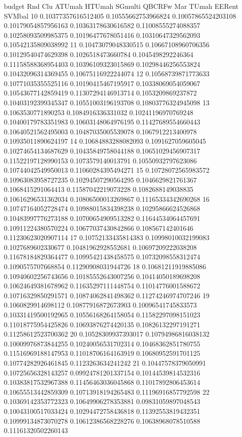 budget Rnd Clu ATUmah HTUmah SGmulti QBCRFw Mar TUmah EERent SVMbal
10 0.10377357616512405 0.10555662753966824 0.10057865524203108 0.10179054857956163 0.10363178630616582 0.11008555274088357 0.10258093509985375 0.10196477678051416 0.10310647329562093 0.10542135809038992
11 0.10473079048330515 0.10667108960706356 0.10129540474629398 0.1026518473660784 0.1045498292246364 0.11158588368954403 0.10396109323015869 0.10298446256553824 0.10432096314369455 0.10675116922244074
12 0.10568739871773633 0.10771035355525116 0.10190415467195917 0.10338069054059067 0.10543677142859419 0.11307294146913714 0.1053209869237872 0.10403192399345347 0.10551003196193708 0.10803776324945098
13 0.1063530771890253 0.1084916336331032 0.10241196970769248 0.10400179783351983 0.10603148064976195 0.11427689554660443 0.10640521562495003 0.10487035005539078 0.1067912213400978 0.10935011890624197
14 0.10684883288082093 0.1091627059605045 0.10274654134687629 0.10435849758044188 0.10651029456907317 0.11522197128990153 0.1073579140013791 0.10550932797623086 0.10744042549950013 0.11060284395494271
15 0.10728072565983572 0.10963083958727235 0.10294507290564295 0.1046629821761367 0.1068415291064413 0.11587042219073228 0.1082688149038835 0.10616296531362034 0.10806500013269867 0.11165334342690268
16 0.10747164052728474 0.10988015834398238 0.10295866624526868 0.10483997776273188 0.10700654909513282 0.11644534064457691 0.10911224380570224 0.10677037430842866 0.108567142401646 0.11230623020907114
17 0.10752133435814383 0.10998010032199083 0.1027689602330677 0.10481962928552681 0.10697209222038208 0.11678184829364477 0.10995421438458575 0.10732098558312474 0.1090575707668854 0.11290908031944726
18 0.10681211919885086 0.10940602256743656 0.10185552643007256 0.10414050189698208 0.10624649381678962 0.11635297111448754 0.11014776001588672 0.10716329850291571 0.10874062841498362 0.11274246974707246
19 0.1060829914698112 0.10877916872673903 0.10096541745833573 0.10331419500192965 0.10556168264158054 0.11582297098151023 0.11018775954425826 0.10693876274420135 0.10826132297191271 0.11258612523700362
20 0.10528309937393017 0.10794986816038132 0.10009976873844255 0.10240056531702314 0.10468362851780755 0.11516969188147953 0.11018706164163919 0.10680952591701125 0.10774282926461845 0.1123263634241242
21 0.10447578379050991 0.10725656328143257 0.09924781201337154 0.10144539814532316 0.10383817532967388 0.11456463036045868 0.11017892806453614 0.10655513442859309 0.10713918194265483 0.11196916857792598
22 0.10369142353772323 0.10649906278353881 0.09831059897048543 0.10043100517033424 0.10294472758436818 0.11392553819432351 0.10999134873070278 0.10612386568228276 0.10638968078510588 0.11161320502260143

